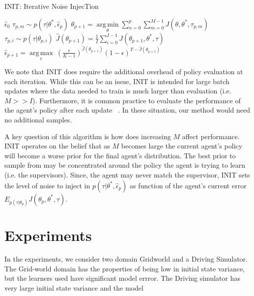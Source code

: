 \documentclass[conference]{article}
\DeclareMathOperator*{\argmin}{arg\,min}
\DeclareMathOperator*{\argmax}{arg\,max}
\begin{document}
\begin{algorithm}[tb]
   \caption{INIT: Iterative Noise InjecTion}
   \label{alg:greedy_ni}
\begin{algorithmic}
    $\hat{\epsilon}_0$
   		   \STATE $\tau_{p,m} \sim p(\tau|\theta^*,\hat{\epsilon}_p)$
   		\ENDFOR
   	\STATE $\theta_{p+1} = \underset{\theta}{\argmin} \sum_{n=0}^p \sum_{m=0}^{M-1} J(\theta,\theta^*,\tau_{p,m})$
   		\STATE $\tau_{p,i} \sim p(\tau|\theta_{p,i})$
   	\ENDFOR
   	\STATE $\hat{J}(\theta_{p+1}) = \frac{1}{I} \sum^{I-1}_{i=0} J(\theta_{p+1},\theta^*,\tau)$
   	\STATE $\hat{\epsilon}_{p+1} = \underset{\epsilon}{\argmax} \: (\frac{\epsilon}{K-1})^{\hat{J}(\theta_{p+1}) }(1-\epsilon)^{T-\hat{J}(\theta_{p+1}) }$
   	\ENDFOR
\end{algorithmic}
\end{algorithm}
 

We note that INIT does require the additional overhead of policy evaluation at each iteration. While this can be an issue, INIT is intended for large batch updates where the data needed to train is much larger than evaluation (i.e. $M >> I$). Furthermore, it is common practice to evaluate the performance of the agent's policy after each update ~\cite{laskey2016comparing}. In these situation, our method would need no additional samples. 


A key question of this algorithm is how does increasing $M$ affect performance. INIT operates on the belief that as $M$ becomes large the current agent's policy will become a worse prior for the final agent's distribution. The best prior to sample from may be concentrated around the policy the agent is trying to learn (i.e. the supervisors). Since, the agent may never match the supervisor, INIT sets the level of noise to inject in $p(\tau|\theta^*,\hat{\epsilon}_p)$ as function of the agent's current error $E_{p(\tau|\theta_p)} J(\theta_p,\theta^*,\tau)$.




\section{Experiments}
In the experiments, we consider two domain Gridworld and a Driving Simulator. The Grid-world domain has the properties of being low in initial state variance, but the learners used have significant model errror. The Driving simulator has very large initial state variance and the model 
\end{document}
